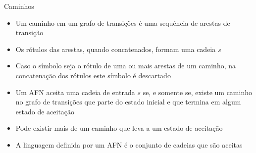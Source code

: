\begin{frame}[fragile]{Caminhos}

    \begin{itemize}
        \item Um caminho em um grafo de transições é uma sequência de arestas de transição
        \pause

        \item Os rótulos das arestas, quando concatenados, formam uma cadeia $s$
        \pause

        \item Caso o símbolo  seja o rótulo de uma ou mais arestas de um caminho, na concatenação dos rótulos este símbolo é descartado
        \pause

        \item Um AFN aceita uma cadeia de entrada $s$ se, e somente se, existe um caminho no grafo de transições que parte do estado inicial e que termina em 
            algum estado de aceitação
        \pause

        \item Pode existir mais de um caminho que leva a um estado de aceitação
        \pause

        \item A linguagem definida por um AFN é o conjunto de cadeias que são aceitas
    \end{itemize}

\end{frame}

